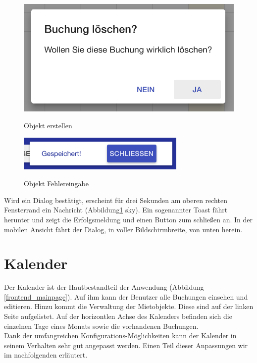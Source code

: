 \begin{figure}[H]
    \centering
    \begin{minipage}[t]{0.49\linewidth}
        \centering
        \includegraphics[width=\linewidth]{images/frontend_booking_delete_dialog.png}
        \label{frontend_booking_delete_dialog}
        \caption{Objekt erstellen}
    \end{minipage}%
    \hfill
    \begin{minipage}[t]{0.49\linewidth}
        \centering
        \includegraphics[width=\linewidth]{images/frontend_toast.png}
        \label{frontend_toast}
        \caption{Objekt Fehlereingabe}
    \end{minipage}
\end{figure}



Wird ein Dialog bestätigt, erscheint für drei Sekunden am oberen rechten Fensterrand ein Nachricht (Abbildung\ref{frontend_toast} sky).
Ein sogenannter Toast fährt herunter und zeigt die Erfolgsmeldung und einen Button zum schließen an. In der mobilen Ansicht fährt der Dialog,
in voller Bildschirmbreite, von unten herein.

\section{Kalender}
Der Kalender ist der Hautbestandteil der Anwendung (Abbildung \ref{frontend_mainpage}). Auf ihm kann der Benutzer alle Buchungen einsehen und editieren.
Hinzu kommt die Verwaltung der Mietobjekte.
Diese sind auf der linken Seite aufgelistet. Auf der horizontlen Achse des Kalenders befinden sich die einzelnen Tage eines Monats sowie die vorhandenen Buchungen.\\
Dank der umfangreichen Konfigurations-Möglichkeiten kann der Kalender in seinem Verhalten sehr gut angepasst werden.
Einen Teil dieser Anpassungen wir im nachfolgenden erläutert.

